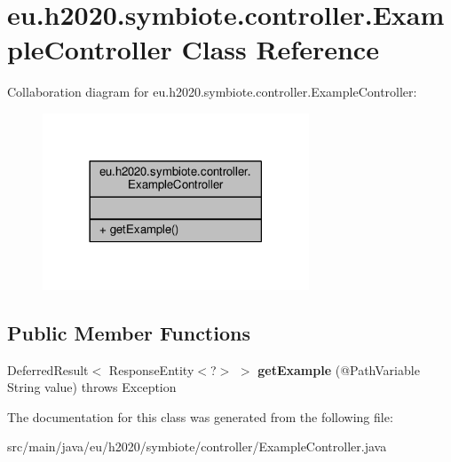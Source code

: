 \hypertarget{classeu_1_1h2020_1_1symbiote_1_1controller_1_1ExampleController}{}\section{eu.\+h2020.\+symbiote.\+controller.\+Example\+Controller Class Reference}
\label{classeu_1_1h2020_1_1symbiote_1_1controller_1_1ExampleController}


Collaboration diagram for eu.\+h2020.\+symbiote.\+controller.\+Example\+Controller\+:
\nopagebreak
\begin{figure}[H]
\begin{center}
\leavevmode
\includegraphics[width=225pt]{classeu_1_1h2020_1_1symbiote_1_1controller_1_1ExampleController__coll__graph}
\end{center}
\end{figure}
\subsection*{Public Member Functions}
\begin{DoxyCompactItemize}
\item 
\mbox{\label{classeu_1_1h2020_1_1symbiote_1_1controller_1_1ExampleController_a08f9ba931b4a8f0a69a80d5785c0f414}} 
Deferred\+Result$<$ Response\+Entity$<$?$>$ $>$ {\bfseries get\+Example} (@Path\+Variable String value)  throws Exception 
\end{DoxyCompactItemize}


The documentation for this class was generated from the following file\+:\begin{DoxyCompactItemize}
\item 
src/main/java/eu/h2020/symbiote/controller/Example\+Controller.\+java\end{DoxyCompactItemize}
